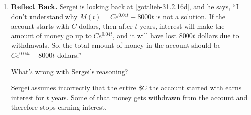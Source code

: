 \documentclass{article}
\begin{document}
\begin{enumerate}
\begin{enumerate}
    \begin{solution}
      We just need to check that $\frac{dM}{dt} \neq 0.04 M - 8000$.  If
      $M(t) = Ce^{0.04t} - 8000t$, then $\frac{dM}{dt} = 0.04 C e^{0.04 t}
      - 8000$ while $0.04 M - 8000 = 0.04 (C e^{0.04 t} - 8000 t) - 8000$,
      so we see that $\frac{dM}{dt} \neq 0.04 M - 8000$.
    \end{solution}

  \end{enumerate}

\item  \begin{problem}
    \textbf{Reflect Back.} Sergei is looking back at
    \ref{gottlieb-31.2.16d}, and he says, ``I don't understand why $M(t) =
    Ce^{0.04t} - 8000t$ is not a solution.  If the account starts with
    $C$ dollars, then after $t$ years, interest will make the amount of
    money go up to $C e^{0.04 t}$, and it will have lost $8000 t$
    dollars due to withdrawals.  So, the total amount of money in the
    account should be $C e^{0.04 t} - 8000 t$ dollars.''

    What's wrong with Sergei's reasoning?
  \end{problem}
  \pspace{\vfill}

  \begin{solution}
    Sergei assumes incorrectly that the entire \$$C$ the account started
    with earns interest for $t$ years.  Some of that money gets withdrawn
    from the account and therefore stops earning interest. 
  \end{solution}

\end{enumerate}

\psreflection{}
\end{document}
